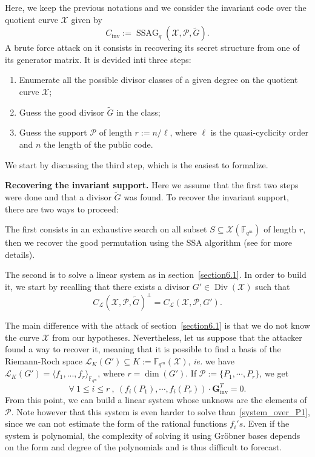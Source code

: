 \documentclass[10pt]{article}
\theoremstyle{definition}
\theoremstyle{definition}
\theoremstyle{definition}
\newcommand{\cd}{\cdot}
\newcommand{\Fqm}{\mathbb{F}_{q^m}}
\newcommand{\su}{\subseteq}
\newcommand{\X}{\mathcal{X}}
\newcommand{\PR}{\mathcal{P}}
\newcommand{\Div}{\operatorname{Div}}
\newcommand{\ssag}{\operatorname{SSAG}}
\newcommand{\calL}{\mathcal{L}}
\begin{document}
Here, we keep the previous notations and we consider the invariant code over the quotient curve $\X$ given by
\[C_{\mathrm{inv}} := \ssag_q(\X,\PR,\tilde{G}).\]
A brute force attack on it consists in recovering its secret structure from one of its generator matrix. It is devided inti three steps:
\begin{enumerate}
\item Enumerate all the possible divisor classes of a given degree on the quotient curve $\X$;
\item Guess the good divisor $\tilde{G}$ in the class;
\item Guess the support $\PR$ of length $r:=n/\ell$, where $\ell$ is the quasi-cyclicity order and $n$ the length of the public code.
\end{enumerate}

We start by discussing the third step, which is the easiest to formalize. 



 \textbf{Recovering the invariant support.} Here we assume that the first two steps were done and that a divisor $\tilde{G}$ was found. To recover the invariant support, there are two ways to proceed: 



 The first consists in an exhaustive search on all subset $S \su \X(\Fqm)$ of length $r$, then we recover the good permutation using the SSA algorithm (see \cite{SSA} for more details). 



 The second is to solve a linear system as in section~\ref{section6.1}. In order to build it, we start by recalling \cite[Prop.~2.2.10]{Sti} that there exists a divisor $G' \in  \Div(\X)$ such that 
\[ C_{\calL}(\X,\PR,\tilde{G})^{\perp} = C_{\calL}(\X,\PR,G').\]

 The main difference with the attack of section~\ref{section6.1} is that we do not know the curve $\X$ from our hypotheses. Nevertheless, let us suppose that the attacker found a way to recover it, meaning that it is possible to find a basis of the Riemann-Roch space $\calL_K(G') \su K:=\Fqm(\X)$, \textit{ie.} we have $\calL_K(G') = \langle f_1,...,f_r \rangle_{\Fqm}$, where $r = \dim(G')$. If $\PR := \{P_1,\cdots,P_r\}$, we get 
\begin{equation*}
\forall \ 1 \leq i \leq r \ , \ (f_i(P_1),\cdots,f_i(P_r)) \cd \mathbf{G}_{\mathrm{inv}}^T = 0.
\end{equation*}
From this point, we can build a linear system whose unknows are the elements of $\PR$.
Note however that this system is even harder to solve than~\eqref{system_over_P1}, since we can not estimate the form of the rational functions $f_i's$. Even if the system is polynomial, the complexity of solving it using Gröbner bases depends on the form and degree of the polynomials and is thus difficult to forecast.
\end{document}
